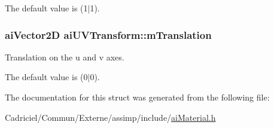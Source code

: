 The default value is (1$\vert$1). \hypertarget{structai_u_v_transform_a8c7f35959aa342bf0cef670246fbb813}{
\subsubsection[{m\-Translation}]{ {\bf ai\-Vector2\-D} ai\-U\-V\-Transform\-::m\-Translation}}\label{structai_u_v_transform_a8c7f35959aa342bf0cef670246fbb813}
Translation on the u and v axes.

The default value is (0$\vert$0). 

The documentation for this struct was generated from the following file\-:\begin{DoxyCompactItemize}
\item 
Cadriciel/\-Commun/\-Externe/assimp/include/\hyperlink{ai_material_8h}{ai\-Material.\-h}\end{DoxyCompactItemize}
